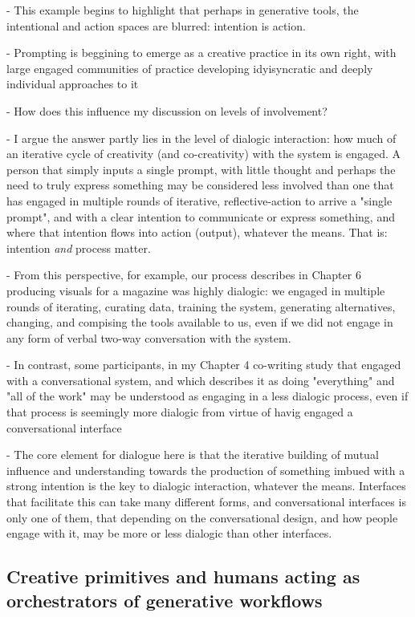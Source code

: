 - This example begins to highlight that perhaps in generative tools, the intentional and action spaces are blurred: intention is action. 

- Prompting is beggining to emerge as a creative practice in its own right, with large engaged communities of practice developing idyisyncratic and deeply individual approaches to it \cite{Chang2023-tv}

- How does this influence my discussion on levels of involvement? 

- I argue the answer partly lies in the level of dialogic interaction: how much of an iterative cycle of creativity (and co-creativity) with the system is engaged. A person that simply inputs a single prompt, with little thought and perhaps the need to truly express something may be considered less involved than one that has engaged in multiple rounds of iterative, reflective-action to arrive a "single prompt", and with a clear intention to communicate or express something, and where that intention flows into action (output), whatever the means. That is: intention \textit{and} process matter.

- From this perspective, for example, our process describes in Chapter 6 producing visuals for a magazine was highly dialogic: we engaged in multiple rounds of iterating, curating data, training the system, generating alternatives, changing, and compising the tools available to us, even if we did not engage in any form of verbal two-way conversation with the system. 

- In contrast, some participants, in my Chapter 4 co-writing study that engaged with a conversational system, and which describes it as doing "everything" and "all of the work" may be understood as engaging in a less dialogic process, even if that process is seemingly more dialogic from virtue of havig engaged a conversational interface

- The core element for dialogue here is that the iterative building of mutual influence and understanding towards the production of something imbued with a strong intention is the key to dialogic interaction, whatever the means. Interfaces that facilitate this can take many different forms, and conversational interfaces is only one of them, that depending on the conversational design, and how people engage with it, may be more or less dialogic than other interfaces.

\subsection{Creative primitives and humans acting as orchestrators of generative workflows}

